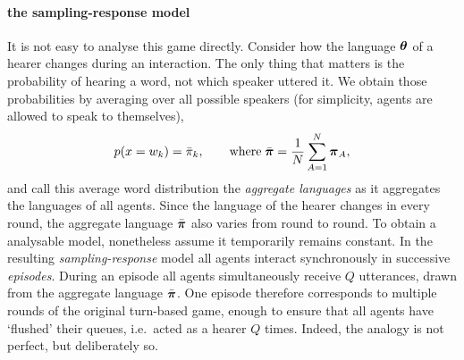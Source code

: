 \documentclass{../src/bcthesispart}
\begin{document}
\paragraph{the sampling-response model}

It is not easy to analyse this game directly.
Consider how the language $\boldsymbol{\mathbf{\theta}}$ of a hearer changes during an interaction.
The only thing that matters is the probability of hearing a word, not which speaker uttered it.
We obtain those probabilities by averaging over all possible speakers (for simplicity, agents are allowed to speak to themselves),
\begin{align}
	p(x = w_k) 
		= \bar\pi_k, 
	\qquad \text{where} \; 
	\bar{\boldsymbol{\mathbf{\pi}}} 
		= \frac{1}{N} \sum_{A=1}^N \boldsymbol{\mathbf{\pi}}_A,
\end{align}
and call this average word distribution the \emph{aggregate languages} as it aggregates the languages of all agents.
Since the language of the hearer changes in every round, the aggregate language $\bar{\boldsymbol{\mathbf{\pi}}}$ also varies from round to round. 
To obtain a analysable model, \textcite{DeVylder2006} nonetheless assume it temporarily remains constant.
In the resulting \emph{sampling-response} model all agents interact synchronously in successive \emph{episodes}.
During an episode all agents simultaneously receive $Q$ utterances, drawn from the aggregate language $\bar{\boldsymbol{\mathbf{\pi}}}$.
One episode therefore corresponds to multiple rounds of the original turn-based game, enough to ensure that all agents have ‘flushed’ their queues, i.e.\ acted as a hearer $Q$ times.
Indeed, the analogy is not perfect, but deliberately so.
\end{document}
